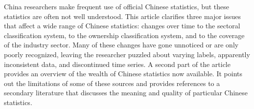 China researchers make frequent use of official Chinese statistics, but these statistics are often not well understood. This article clarifies three major issues that affect a wide range of Chinese statistics: changes over time to the sectoral classification system, to the ownership classification system, and to the coverage of the industry sector. Many of these changes have gone unnoticed or are only poorly recognized, leaving the researcher puzzled about varying labels, apparently inconsistent data, and discontinued time series. A second part of the article provides an overview of the wealth of Chinese statistics now available. It points out the limitations of some of these sources and provides references to a secondary literature that discusses the meaning and quality of particular Chinese statistics.

